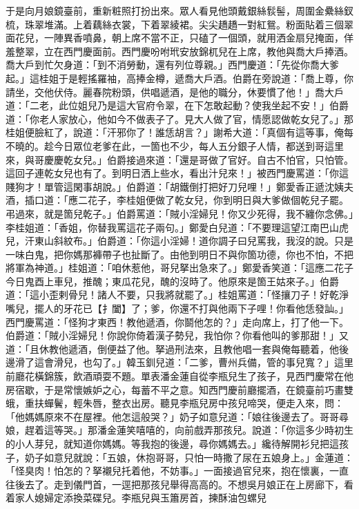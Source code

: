 \begin{showcontents}{}
于是向月娘鏡臺前，重新粧照打扮出來。眾人看見他頭戴銀絲䯼髻，周圍金纍絲釵梳，珠翠堆滿。上着藕絲衣裳，下着翠綾裙。尖尖趫趫一對紅鴛。粉面貼着三個翠面花兒，一陣異香噴鼻，朝上席不當不正，只磕了一個頭，就用洒金扇兒掩面，佯羞整翠，立在西門慶面前。西門慶吩咐玳安放錦杌兒在上席，教他與喬大戶捧酒。喬大戶到忙欠身道：「到不消勞動，還有列位尊親。」西門慶道：「先從你喬大爹起。」這桂姐于是輕搖羅袖，高捧金樽，遞喬大戶酒。伯爵在旁說道：「喬上尊，你請坐，交他伏侍。麗春院粉頭，供唱遞酒，是他的職分，休要慣了他！」喬大戶道：「二老，此位姐兒乃是這大官府令翠，在下怎敢起動？使我坐起不安！」伯爵道：「你老人家放心，他如今不做表子了。見大人做了官，情愿認做乾女兒了。」那桂姐便臉紅了，說道：「汗邪你了！誰恁胡言？」謝希大道：「真個有這等事，俺每不曉的。趁今日眾位老爹在此，一箇也不少，每人五分銀子人情，都送到哥這里來，與哥慶慶乾女兒。」伯爵接過來道：「還是哥做了官好。自古不怕官，只怕管。這回子連乾女兒也有了。到明日洒上些水，看出汁兒來！」被西門慶罵道：「你這賤狗才！單管這閑事胡說。」伯爵道：「胡鐵倒打把好刀兒哩！」鄭愛香正遞沈姨夫酒，插口道：「應二花子，李桂姐便做了乾女兒，你到明日與大爹做個乾兒子罷。弔過來，就是箇兒乾子。」伯爵罵道：「賊小淫婦兒！你又少死得，我不纏你念佛。」李桂姐道：「香姐，你替我罵這花子兩句。」鄭愛白兒道：「不要理這望江南巴山虎兒，汗東山斜紋布。」伯爵道：「你這小淫婦！道你調子曰兒罵我，我沒的說。只是一味白鬼，把你媽那褲帶子也扯斷了。由他到明日不與你箇功德，你也不怕，不把將軍為神道。」桂姐道：「咱休惹他，哥兒拏出急來了。」鄭愛香笑道：「這應二花子今日鬼酉上車兒，推醜；東瓜花兒，醜的沒時了。他原來是箇王姑來子。」伯爵道：「這小歪剌骨兒！諸人不要，只我將就罷了。」桂姐罵道：「怪攘刀子！好乾淨嘴兒，擺人的牙花已【扌闔】了；爹，你還不打與他兩下子哩！你看他恁發訕。」西門慶罵道：「怪狗才東西！教他遞酒，你鬬他怎的？」走向席上，打了他一下。伯爵道：「賊小淫婦兒！你說你倚着漢子勢兒，我怕你？你看他叫的爹那甜！」又道：「且休教他遞酒，倒便益了他。拏過刑法來，且教他唱一套與俺每聽着，他後邊滑了這會滑兒，也勾了。」韓玉釧兒道：「二爹，曹州兵備，管的事兒寬？」這里前廳花橫錦簇，飲酒頑耍不題。單表潘金蓮自從李瓶兒生了孩子，見西門慶常在他房宿歇，于是常懷嫉妒之心，每蓄不平之意。知西門慶前廳擺酒，在鏡臺前巧畫雙蛾，重扶蟬鬢，輕朱唇，整衣出房。聽見李瓶兒房中孩兒啼哭，便走入來，問：「他媽媽原來不在屋裡。他怎這般哭？」奶子如意兒道：「娘往後邊去了。哥哥尋娘，趕着這等哭。」那潘金蓮笑嘻嘻的，向前戲弄那孩兒。說道：「你這多少時初生的小人芽兒，就知道你媽媽。等我抱的後邊，尋你媽媽去。」纔待解開衫兒把這孩子，奶子如意兒就說：「五娘，休抱哥哥，只怕一時撒了尿在五娘身上。」金蓮道：「怪臭肉！怕怎的？拏襯兒托着他，不妨事。」一面接過官兒來，抱在懷裏，一直往後去了。走到儀門首，一逕把那孩兒舉得高高的。不想吳月娘正在上房廊下，看着家人媳婦定添換菜碟兒。李瓶兒與玉簫房首，揀酥油包螺兒 
\end{showcontents}
